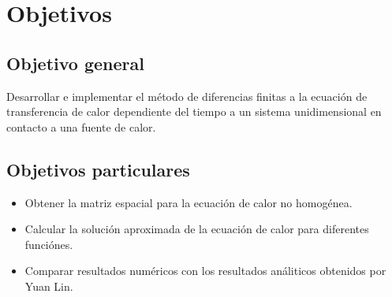 \section{Objetivos}

\subsection{Objetivo general}

Desarrollar e implementar el método de diferencias finitas a la ecuación de transferencia de calor dependiente del tiempo a un sistema unidimensional en contacto a una fuente de calor.

\subsection{Objetivos particulares}

\begin{itemize}
    \item Obtener la matriz espacial para la ecuación de calor no homogénea.
    \item Calcular la solución aproximada de la ecuación de calor para diferentes funciónes.
    \item Comparar resultados numéricos con los resultados análiticos obtenidos por Yuan Lin\cite{yuan_2009}.
\end{itemize}

